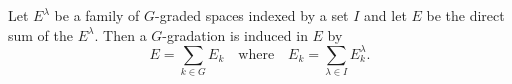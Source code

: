 Let $E^\lambda$ be a family of $G$-graded spaces indexed by a set $I$ and let $E$ be the direct sum of the $E^\lambda$. Then a $G$-gradation is induced in $E$ by
$$E = \sum_{k \in G} E_k \quad \text{where} \quad E_k = \sum_{\lambda \in I} E_k^\lambda.$$
